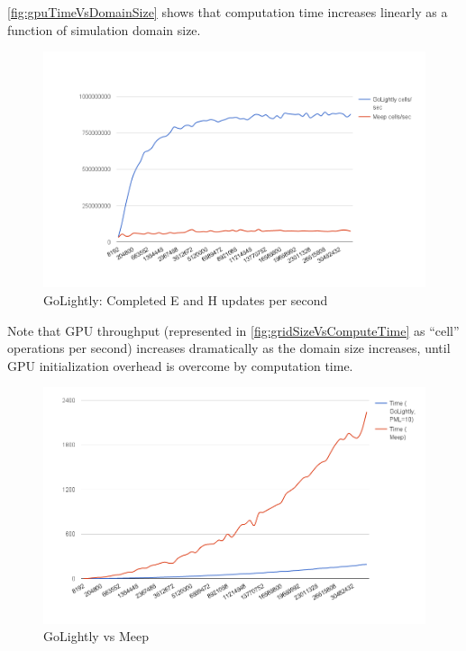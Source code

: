 \autoref{fig:gpuTimeVsDomainSize} shows that computation time increases linearly as a function of simulation domain size.


\begin{figure}[H]
	\centering
	\includegraphics[width=\textwidth,
	keepaspectratio]{cells-per-second.png}
	\caption{GoLightly: Completed E and H updates per second}
	\label{fig:gridSizeVsComputeTime}
\end{figure}

Note that GPU throughput (represented in \autoref{fig:gridSizeVsComputeTime} as “cell” operations per second) increases dramatically as the domain size increases, until GPU initialization overhead is overcome by computation time.

\begin{figure}[H]
	\centering
	\includegraphics[width=\textwidth,
	keepaspectratio]{gpu-vs-meep.png}
	\caption{GoLightly vs Meep}
	\label{fig:gpuVsMeep}
\end{figure}


